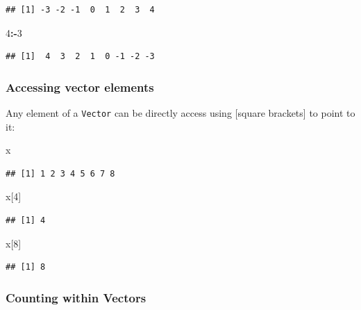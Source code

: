 \documentclass[]{book}
\newenvironment{Shaded}{\begin{snugshade}}{\end{snugshade}}
\newcommand{\DecValTok}[1]{\textcolor[rgb]{0.00,0.00,0.81}{#1}}
\newcommand{\NormalTok}[1]{#1}
\newcommand{\OperatorTok}[1]{\textcolor[rgb]{0.81,0.36,0.00}{\textbf{#1}}}
\theoremstyle{definition}
\theoremstyle{definition}
\theoremstyle{definition}
\theoremstyle{remark}
\begin{document}
\begin{verbatim}
## [1] -3 -2 -1  0  1  2  3  4
\end{verbatim}

\begin{Shaded}
\begin{Highlighting}[]
\DecValTok{4}\OperatorTok{:-}\DecValTok{3}
\end{Highlighting}
\end{Shaded}

\begin{verbatim}
## [1]  4  3  2  1  0 -1 -2 -3
\end{verbatim}

\hypertarget{accessing-vector-elements}{%
\subsubsection{Accessing vector
elements}\label{accessing-vector-elements}}

Any element of a \texttt{Vector} can be directly access using {[}square
brackets{]} to point to it:

\begin{Shaded}
\begin{Highlighting}[]
\NormalTok{x}
\end{Highlighting}
\end{Shaded}

\begin{verbatim}
## [1] 1 2 3 4 5 6 7 8
\end{verbatim}

\begin{Shaded}
\begin{Highlighting}[]
\NormalTok{x[}\DecValTok{4}\NormalTok{]}
\end{Highlighting}
\end{Shaded}

\begin{verbatim}
## [1] 4
\end{verbatim}

\begin{Shaded}
\begin{Highlighting}[]
\NormalTok{x[}\DecValTok{8}\NormalTok{]}
\end{Highlighting}
\end{Shaded}

\begin{verbatim}
## [1] 8
\end{verbatim}

\hypertarget{counting-within-vectors}{%
\subsubsection{Counting within Vectors}\label{counting-within-vectors}}
\end{document}
